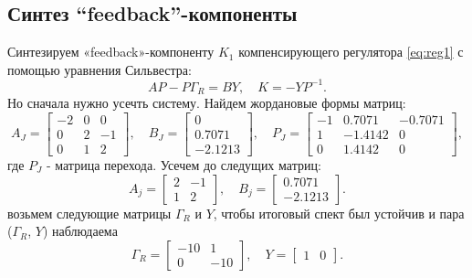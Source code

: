 \subsection{Синтез ``feedback''-компоненты}
\label{sec:feedback1}
Синтезируем «feedback»-компоненту $K_1$ компенсирующего регулятора \eqref{eq:reg1}
с помощью уравнения Сильвестра:
\begin{equation}
    \label{eq:silv}
    AP-P\Gamma_R=BY,\quad K=-YP^{-1}.
\end{equation}
Но сначала нужно усечть систему. Найдем жордановые формы матриц:
\begin{equation*}
    A_J=\begin{bmatrix}
        -2&     0&     0\\
        0&     2&    -1\\
        0&     1&     2   
    \end{bmatrix},\quad
    B_J=\begin{bmatrix}
        0\\
        0.7071\\
       -2.1213
    \end{bmatrix},\quad
    P_J = \begin{bmatrix}
        -1&    0.7071&   -0.7071\\
        1&   -1.4142&         0\\
             0    &1.4142&         0
    \end{bmatrix},
\end{equation*}
где $P_J$ - матрица перехода. Усечем до следущих матриц:
\begin{equation*}
    A_j=\begin{bmatrix}
        2&    -1\\
        1&     2   
    \end{bmatrix},\quad
    B_j=\begin{bmatrix}
        0.7071\\
       -2.1213
    \end{bmatrix}.
\end{equation*}
возьмем следующие матрицы $\Gamma_R$ и $Y$, чтобы итоговый спект был устойчив и
пара ($\Gamma_R$, $Y$) наблюдаема
\begin{equation*}
    \Gamma_R=\begin{bmatrix}
        -10 & 1\\0&-10
    \end{bmatrix},\quad
    Y=\begin{bmatrix}
        1 & 0
    \end{bmatrix}.
\end{equation*}
